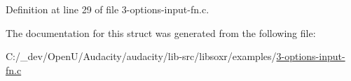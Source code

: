 Definition at line 29 of file 3-\/options-\/input-\/fn.\+c.



The documentation for this struct was generated from the following file\+:\begin{DoxyCompactItemize}
\item 
C\+:/\+\_\+dev/\+Open\+U/\+Audacity/audacity/lib-\/src/libsoxr/examples/\hyperlink{3-options-input-fn_8c}{3-\/options-\/input-\/fn.\+c}\end{DoxyCompactItemize}

